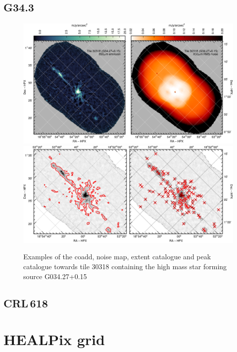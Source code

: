 \documentclass[twocolumn]{aastex6}
\begin{document}
\subsection{G34.3}
\begin{figure}
  \centering
  \includegraphics{tile30318-g34-coadd-noise.pdf}
  \\[3mm]
  \includegraphics{tile30318-g34-extent-peak.pdf}
  \caption{Examples of the coadd, noise map, extent catalogue and peak
    catalogue towards tile 30318 containing the high mass star forming
    source G034.27+0.15}
  \label{fig:g34-3}
\end{figure}
\subsection{CRL\,618}


\section{HEALPix grid}
\end{document}
